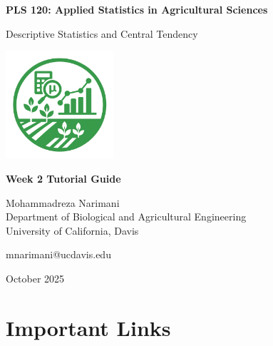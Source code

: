 \documentclass[11pt,a4paper]{article}
\begin{document}
\begin{titlepage}
    \centering
    \vspace*{2cm}
    
    {\Huge\bfseries\color{primarygreen} PLS 120: Applied Statistics in Agricultural Sciences}
    
    \vspace{1cm}
    
    {\Large\color{primarygreen} Descriptive Statistics and Central Tendency}
    
    \vspace{2cm}
    
    \includegraphics[width=0.3\textwidth]{../../images/logos/Home_Page_Logo.png}
    
    \vspace{2cm}
    
    {\large\bfseries Week 2 Tutorial Guide}
    
    \vspace{1cm}
    
    {\large Mohammadreza Narimani}\\
    {\normalsize Department of Biological and Agricultural Engineering}\\
    {\normalsize University of California, Davis}
    
    \vspace{1cm}
    
    {\normalsize mnarimani@ucdavis.edu}
    
    \vfill
    
    {\normalsize October 2025}
\end{titlepage}

\tableofcontents
\newpage

\section{Important Links}
\end{document}
